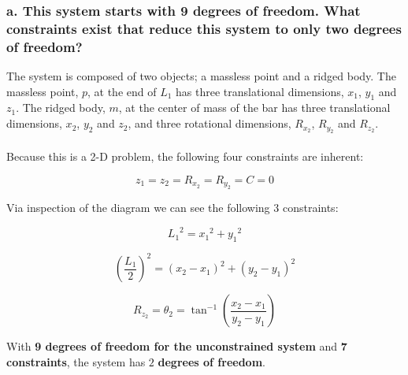 \documentclass[12pt, letterpaper]{../assignment}
\begin{document}
\begin{center}

\end{center}

\subsubsection*{a. This system starts with 9 degrees of freedom. What constraints exist that reduce this system to
only two degrees of freedom?}
The system is composed of two objects; a massless point and a ridged body.
The massless point, $p$, at the end of $L_1$ has three translational dimensions, $x_1$, $y_1$ and $z_1$.
The ridged body, $m$, at the center of mass of the bar has three translational dimensions, $x_2$, $y_2$ and $z_2$,
and three rotational dimensions, $R_{x_2}$, $R_{y_2}$ and $R_{z_2}$.
\\\\
Because this is a 2-D problem, the following four constraints are inherent:

$$z_1 = z_2= R_{x_2} = R_{y_2} = C =0$$

Via inspection of the diagram we can see the following 3 constraints:

$$ {L_1}^2  = {x_1}^2  + {y_1}^2 $$

$$ \left(\frac{L_1}{2}\right)^2  = \left({x_2}-{x_1}\right)^2  + \left({y_2}-{y_1}\right)^2 $$

$$ R_{z_2}= \theta_2 = \tan^{-1}\left( \frac{{x_2}-{x_1}}{{y_2}-{y_1}} \right) $$

\begin{answer}
With \textbf{9 degrees of freedom for the unconstrained system} and \textbf{7 constraints},
the system has $2$ \textbf{degrees of freedom}.
\end{answer}
\end{document}
